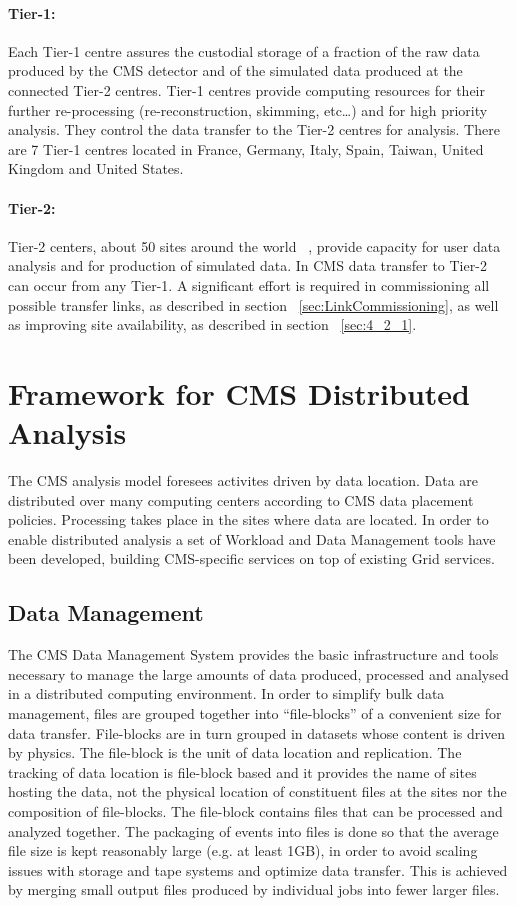 \paragraph{Tier-1:} 
Each Tier-1 centre assures the custodial storage of a fraction of the raw data produced by the CMS detector and of the simulated data produced at the connected Tier-2 centres. Tier-1 centres provide computing resources for their further re-processing (re-reconstruction, skimming, etc…) and for high priority analysis.
They control the data transfer to the Tier-2 centres for analysis. There are 7 Tier-1 centres located in France, Germany, Italy, Spain, Taiwan, United Kingdom and United States.

\paragraph{Tier-2:}
Tier-2 centers, about 50 sites around the world ~\cite{RefSite}, provide capacity for user data analysis and for production of simulated data.
In CMS data transfer to Tier-2 can occur from any Tier-1. A significant effort is required in 
commissioning all possible transfer links, as described in section ~\ref{sec:LinkCommissioning}, as well
as improving site availability, as described in section ~\ref{sec:4_2_1}.

\section{Framework for CMS Distributed Analysis}
\label{sec:3}
The CMS analysis model foresees activites driven by data location. Data are distributed over many computing centers according to CMS data placement policies. Processing takes place in the sites where data are located. In order to enable distributed analysis a set of Workload and Data Management tools have been developed, building CMS-specific services on top of existing Grid services.

\subsection{Data Management}
\label{sec:3_1}
The CMS Data Management System provides the basic infrastructure and tools necessary to manage the large amounts of data produced, processed and analysed in a distributed computing environment. 
In order to simplify bulk data management, files are grouped together into “file-blocks”  of a convenient size for data transfer. 
File-blocks are in turn grouped in datasets whose content is driven by physics.
The file-block is the unit of data location and replication. 
The tracking of data location is file-block based and it provides the name of sites hosting the data, not the physical location of constituent files at the sites nor the composition of file-blocks.
The file-block contains files that can be processed and analyzed together.
The packaging of events into files is done so that the average file size is
kept reasonably large (e.g. at least 1GB), in order to avoid scaling issues with storage and tape systems and optimize data transfer.
This is achieved by merging small output files produced by individual jobs into fewer larger files.


